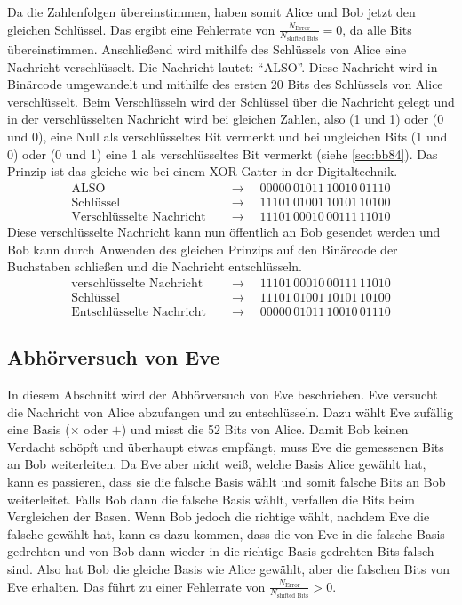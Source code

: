 \noindent Da die Zahlenfolgen übereinstimmen, haben somit Alice und Bob jetzt den gleichen Schlüssel. Das ergibt eine Fehlerrate von $\frac{N_\text{Error}}{N_\text{shifted Bits}} = 0$, da alle Bits übereinstimmen.
Anschließend wird mithilfe des Schlüssels von Alice eine Nachricht verschlüsselt.
Die Nachricht lautet: ``ALSO''. Diese Nachricht wird in Binärcode umgewandelt und 
mithilfe des ersten 20 Bits des Schlüssels von Alice verschlüsselt.
Beim Verschlüsseln wird der Schlüssel über die Nachricht gelegt und in der verschlüsselten
Nachricht wird bei gleichen Zahlen, also (1 und 1) oder (0 und 0), eine Null als
verschlüsseltes Bit vermerkt und bei ungleichen Bits (1 und 0) oder (0 und 1) eine
1 als verschlüsseltes Bit vermerkt (siehe \autoref{sec:bb84}). Das Prinzip ist das gleiche wie bei einem 
XOR-Gatter in der Digitaltechnik.
\begin{align*}
\text{ALSO} & \quad \rightarrow \quad 00000 \, 01011 \, 10010 \, 01110 \\
\text{Schlüssel} & \quad \rightarrow \quad 11101 \, 01001 \, 10101 \, 10100\\
\text{Verschlüsselte Nachricht} & \quad \rightarrow \quad 11101 \, 00010 \, 00111 \, 11010
\end{align*}
Diese verschlüsselte Nachricht kann nun öffentlich an Bob gesendet werden und Bob kann durch Anwenden des gleichen Prinzips auf den Binärcode der Buchstaben schließen und die Nachricht entschlüsseln.
\begin{align*}
\text{verschlüsselte Nachricht} & \quad \rightarrow \quad 11101 \, 00010 \, 00111 \, 11010 \\
\text{Schlüssel} & \quad \rightarrow \quad 11101 \, 01001 \, 10101 \, 10100\\
\text{Entschlüsselte Nachricht} & \quad \rightarrow \quad 00000 \, 01011 \, 10010 \, 01110 
\end{align*}

\subsection{Abhörversuch von Eve}
\label{sec:a2}
In diesem Abschnitt wird der Abhörversuch von Eve beschrieben. Eve versucht die Nachricht von Alice
abzufangen und zu entschlüsseln. Dazu wählt Eve zufällig eine Basis ($\times$ oder $+$) und misst die 52 Bits von Alice. 
Damit Bob keinen Verdacht schöpft und überhaupt etwas empfängt, muss Eve die gemessenen Bits an Bob weiterleiten. Da Eve aber nicht weiß, 
welche Basis Alice gewählt hat, kann es passieren, dass sie die falsche Basis wählt und somit falsche Bits an Bob weiterleitet.
Falls Bob dann die falsche Basis wählt, verfallen die Bits beim Vergleichen der Basen. Wenn Bob jedoch die richtige wählt, nachdem Eve die falsche gewählt hat, kann es 
dazu kommen, dass die von Eve in die falsche Basis gedrehten und von Bob dann wieder in die richtige Basis gedrehten Bits falsch sind. Also hat Bob die gleiche Basis wie Alice 
gewählt, aber die falschen Bits von Eve erhalten. Das führt zu einer Fehlerrate von $\frac{N_\text{Error}}{N_\text{shifted Bits}} > 0$. 

